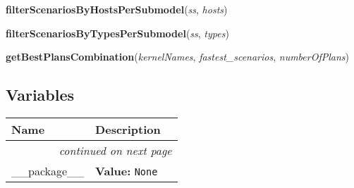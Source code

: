 \hspace{.8\funcindent}\begin{boxedminipage}{\funcwidth}

    \raggedright \textbf{filterScenariosByHostsPerSubmodel}(\textit{ss}, \textit{hosts})

\setlength{\parskip}{2ex}
\setlength{\parskip}{1ex}
    \end{boxedminipage}

    \label{scenarios:filterScenariosByTypesPerSubmodel}

    \vspace{0.5ex}

\hspace{.8\funcindent}\begin{boxedminipage}{\funcwidth}

    \raggedright \textbf{filterScenariosByTypesPerSubmodel}(\textit{ss}, \textit{types})

\setlength{\parskip}{2ex}
\setlength{\parskip}{1ex}
    \end{boxedminipage}

    \label{scenarios:getBestPlansCombination}

    \vspace{0.5ex}

\hspace{.8\funcindent}\begin{boxedminipage}{\funcwidth}

    \raggedright \textbf{getBestPlansCombination}(\textit{kernelNames}, \textit{fastest\_scenarios}, \textit{numberOfPlans})

\setlength{\parskip}{2ex}
\setlength{\parskip}{1ex}
    \end{boxedminipage}



  \subsection{Variables}

    \vspace{-1cm}
\hspace{\varindent}\begin{longtable}{|p{\varnamewidth}|p{\vardescrwidth}|l}
\cline{1-2}
\cline{1-2} \centering \textbf{Name} & \centering \textbf{Description}& \\
\cline{1-2}
\endhead\cline{1-2}\multicolumn{3}{r}{\small\textit{continued on next page}}\\\endfoot\cline{1-2}
\endlastfoot\raggedright \_\-\_\-p\-a\-c\-k\-a\-g\-e\-\_\-\_\- & \raggedright \textbf{Value:} 
{\tt None}&\\
\cline{1-2}
\end{longtable}



